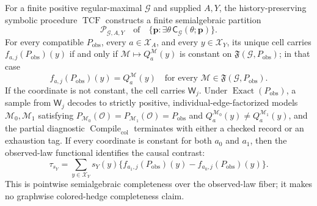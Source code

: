 For a finite positive regular-maximal \(\mathcal G\) and supplied \(A,Y\), the history-preserving symbolic procedure \(\operatorname{TCF}\) constructs a finite semialgebraic partition
\[
\mathscr P_{\mathcal G,A,Y}
\quad\text{of}\quad
\{\mathbf p:\exists\theta\,\mathsf C_{\mathcal G}(\theta;\mathbf p)\}.
\]
For every compatible \(P_{\mathrm{obs}}\), every \(a\in\mathcal X_A\), and every \(y\in\mathcal X_Y\), its unique cell carries \(f_{a,j}(P_{\mathrm{obs}})(y)\) if and only if \(\mathcal M\mapsto Q_a^{\mathcal M}(y)\) is constant on \(\mathfrak F(\mathcal G,P_{\mathrm{obs}})\); in that case
\[
f_{a,j}(P_{\mathrm{obs}})(y)=Q_a^{\mathcal M}(y)
\quad\text{for every }\mathcal M\in\mathfrak F(\mathcal G,P_{\mathrm{obs}}).
\]
If the coordinate is not constant, the cell carries \(\mathsf W_j\). Under \(\operatorname{Exact}(P_{\mathrm{obs}})\), a sample from \(\mathsf W_j\) decodes to strictly positive, individual-edge-factorized models \(\mathcal M_0,\mathcal M_1\) satisfying \(P_{\mathcal M_0}(\mathcal O)=P_{\mathcal M_1}(\mathcal O)=P_{\mathrm{obs}}\) and \(Q_a^{\mathcal M_0}(y)\neq Q_a^{\mathcal M_1}(y)\), and the partial diagnostic \(\operatorname{Compile}_{\mathrm{col}}\) terminates with either a checked record or an exhaustion tag. If every coordinate is constant for both \(a_0\) and \(a_1\), then the observed-law functional identifies the causal contrast:
\[
\tau_{s_Y}
=\sum_{y\in\mathcal X_Y}s_Y(y)
\{f_{a_1,j}(P_{\mathrm{obs}})(y)-f_{a_0,j}(P_{\mathrm{obs}})(y)\}.
\]
This is pointwise semialgebraic completeness over the observed-law fiber; it makes no graphwise colored-hedge completeness claim.